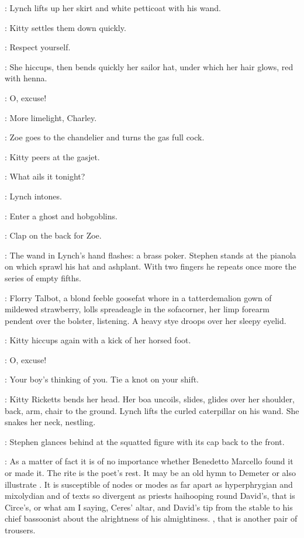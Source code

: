 :
Lynch lifts up her skirt and white petticoat with his wand.

:
Kitty settles them down quickly.

\Kitty:
Respect yourself.

:
She hiccups,
then bends quickly her sailor hat,
under which her hair glows,
red with henna.

\Kitty:
O,
excuse!

\Zoe:
More limelight,
Charley.

:
Zoe goes to the chandelier and turns the gas full cock.

:
Kitty peers at the gasjet.

\Kitty:
What ails it tonight?

:
Lynch intones.

\Lynch:
Enter a ghost and hobgoblins.

\Zoe:
Clap on the back for Zoe.

:
The wand in Lynch's hand flashes:
a brass poker.
Stephen stands at the pianola on which sprawl his hat and ashplant.
With two fingers he repeats once more the series of empty fifths.

:
Florry Talbot,
a blond feeble goosefat whore
in a tatterdemalion gown of mildewed strawberry,
lolls spreadeagle in the sofacorner,
her limp forearm pendent over the bolster,
listening.
A heavy stye droops over her sleepy eyelid.

:
Kitty hiccups again with a kick of her horsed foot.

\Kitty:
O,
excuse!

\Zoe:
Your boy's thinking of you.
Tie a knot on your shift.

:
Kitty Ricketts bends her head.
Her boa uncoils,
slides,
glides over her shoulder,
back,
arm,
chair to the ground.
Lynch lifts the curled caterpillar on his wand.
She snakes her neck,
nestling.

:
Stephen glances behind at the squatted figure with its cap back to the front.

\Stephen:
As a matter of fact it is of no importance
whether Benedetto Marcello found it or made it.
The rite is the poet's rest.
It may be an old hymn to Demeter
or also illustrate .
It is susceptible of nodes or modes as far apart as hyperphrygian and mixolydian
and of texts so divergent as priests haihooping round David's,
that is Circe's,
or what am I saying,
Ceres' altar,
and David's tip from the stable to his chief bassoonist
about the alrightness of his almightiness.
,
that is another pair of trousers.

